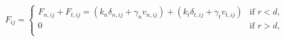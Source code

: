 \begin{equation}
 F_{ij} = 
\begin{cases}
F_{n,ij} + F_{t,ij} = \left( k_n \delta_{n,ij} + \gamma_n v_{n,ij} \right) + \left( k_t \delta_{t,ij} + \gamma_t v_{t,ij} \right) & \text{if } r < d ,\\
0    & \text{if } r > d ,\\
\end{cases}
 \label{eq:forceij}
\end{equation}
